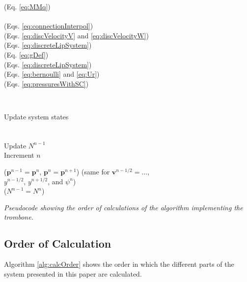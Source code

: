 \begin{algorithm}[t]
{{{\begin{minipage}[c]{0.43\linewidth}
                (Eq. \eqref{eq:MMq})\\
                \vspace{-0.15em}\\
                (Eqs. \eqref{eq:connectionInterpol})\vspace{0.05em}\\
                (Eqs. \eqref{eq:discVelocityV} and \eqref{eq:discVelocityW})\\
                (Eqs. \eqref{eq:discreteLipSystem})\\
                (Eq. \eqref{eq:gDef})\\
                (Eqs. \eqref{eq:discreteLipSystem})\\
                (Eqs. \eqref{eq:bernoulli} and \eqref{eq:Ur})\\
                (Eqs. \eqref{eq:pressuresWithSC})
                \vspace{0.25em}\\
           \end{minipage}
           \\
           \begin{minipage}[c]{0.4\linewidth}
                Update system states\\
                \\
                \\
                Update $N^{n-1}$ \\
                Increment $n$      
            \end{minipage}
            \begin{minipage}[c]{0.5\linewidth}
                ($\mathbf{p}^{n-1} = \mathbf{p}^{n}$, $\mathbf{p}^n=\mathbf{p}^{n+1}$)
                (same for $\mathbf{v}^{n-1/2} = \hdots$,\\
                $y^{n-1/2}$, $y^{n+1/2}$, and $\psi^n$)\\
                ($N^{n-1} = N^n$)\\
            \end{minipage}
            }
        }
    }
    \vspace{0.12cm}
    \caption{\it Pseudocode showing the order of calculations of the algorithm implementing the trombone.\label{alg:calcOrder}}
\end{algorithm}
\subsection{Order of Calculation}

Algorithm \ref{alg:calcOrder} shows the order in which the different parts of the system presented in this paper are calculated. 
